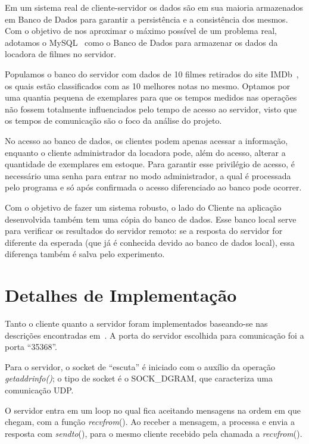 \documentclass[12pt,a4paper]{article}
\begin{document}
Em um sistema real de cliente-servidor os dados são em sua maioria armazenados em Banco de Dados para garantir a persistência e a consistência dos mesmos. Com o objetivo de nos aproximar o máximo possível de um problema real, adotamos o MySQL~\cite{mysql1995mysql} como o Banco de Dados para armazenar os dados da locadora de filmes no servidor.

    Populamos o banco do servidor com dados de 10 filmes retirados do site IMDb~\cite{IMDbsite}, os quais estão classificados com as 10 melhores notas no mesmo. Optamos por uma quantia pequena de exemplares para que os tempos medidos nas operações não fossem totalmente influenciados pelo tempo de acesso ao servidor, visto que os tempos de comunicação são o foco da análise do projeto.
    
    No acesso ao banco de dados, os clientes podem apenas acessar a informação, enquanto o cliente administrador da locadora pode, além do acesso, alterar a quantidade de exemplares em estoque. Para garantir esse privilégio de acesso, é necessário uma senha para entrar no modo administrador, a qual é processada pelo programa e só após confirmada o acesso diferenciado ao banco pode ocorrer.
    
Com o objetivo de fazer um sistema robusto, o lado do Cliente na aplicação desenvolvida também tem uma cópia do banco de dados. Esse banco local serve para verificar os resultados do servidor remoto: se a resposta do servidor for diferente da esperada (que já é conhecida devido ao banco de dados local), essa diferença também é salva pelo experimento.

\section{Detalhes de Implementação}

Tanto o cliente quanto a servidor foram implementados baseando-se nas descrições encontradas em~\cite{hall19beej}. A porta do servidor escolhida para comunicação foi a porta “35368”.

Para o servidor, o socket de “escuta” é iniciado com o auxílio da operação {\it getaddrinfo()}; o tipo de socket é o SOCK\_DGRAM, que caracteriza uma comunicação UDP.

O servidor entra em um loop no qual fica aceitando mensagens na ordem em que chegam, com a função {\it recvfrom}(). Ao receber a mensagem, a processa e envia a resposta com {\it sendto}(), para o mesmo cliente recebido pela chamada a {\it recvfrom}().
\end{document}
